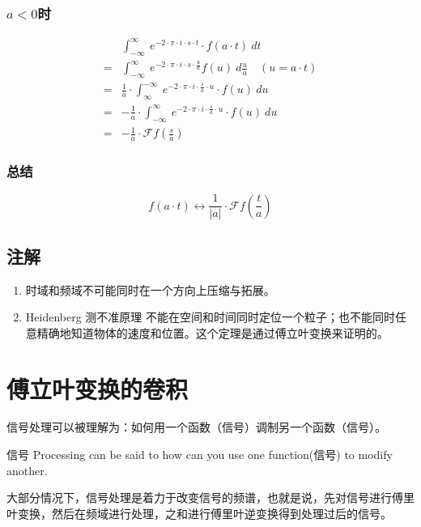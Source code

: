 \subsubsection{$a<0$时}
\begin{align*}
	  & \int_{-\infty}^{\infty}\ e^{-2\cdot \pi\cdot i\cdot s\cdot t}\cdot f(a\cdot t)\ dt                          \\
	= & \int_{-\infty}^{\infty}\ e^{-2\cdot \pi\cdot i\cdot s\cdot \frac{u}{a}}f(u)\ d\frac{u}{a}\quad (u=a\cdot t) \\
	= & \frac{1}{a}\cdot \int_{\infty}^{-\infty}\ e^{-2\cdot \pi\cdot i\cdot \frac{s}{a}\cdot u}\cdot f(u)\ du      \\
	= & -\frac{1}{a}\cdot \int_{-\infty}^{\infty}\ e^{-2\cdot \pi\cdot i\cdot \frac{s}{a}\cdot u}\cdot f(u)\ du     \\
	= & -\frac{1}{a}\cdot \mathcal{F}f(\frac{s}{a})
\end{align*}
\subsubsection{总结}
$$
	f(a\cdot t)\leftrightarrow \frac{1}{|a|}\cdot \mathcal{F}f(\frac{t}{a})
$$
\subsection{注解}
\begin{enumerate}
	\item 时域和频域不可能同时在一个方向上压缩与拓展。
	\item Heidenberg 测不准原理
	      不能在空间和时间同时定位一个粒子；也不能同时任意精确地知道物体的速度和位置。这个定理是通过傅立叶变换来证明的。
\end{enumerate}
\section{傅立叶变换的卷积}
信号处理可以被理解为：如何用一个函数（信号）调制另一个函数（信号）。

信号 Processing can be said to how can you use one function(信号) to modify another.

大部分情况下，信号处理是着力于改变信号的频谱，也就是说，先对信号进行傅里叶变换，然后在频域进行处理，之和进行傅里叶逆变换得到处理过后的信号。
